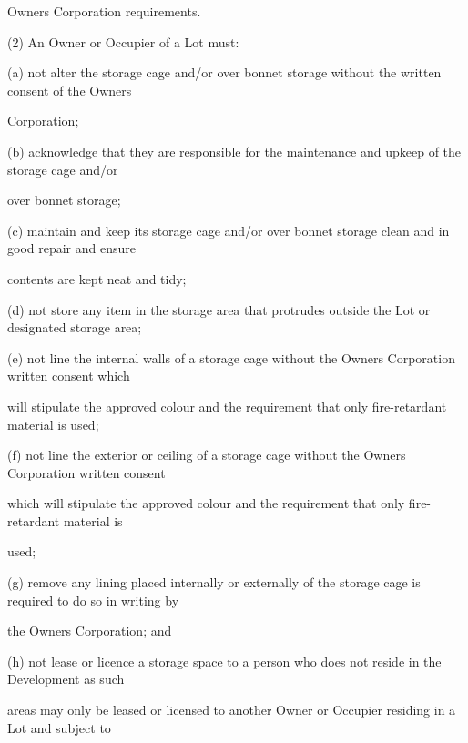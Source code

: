 \documentclass{article}
\begin{document}
{\fontsize{10.02}{1}Owners Corporation requirements. }

{\fontsize{9.962}{1}(2) An Owner or Occupier of a Lot must: }

{\fontsize{9.962}{1}(a) not alter the storage cage and/or over bonnet storage without the written consent of the Owners }

{\fontsize{10.02}{1}Corporation; }

{\fontsize{9.962}{1}(b) acknowledge that they are responsible for the maintenance and upkeep of the storage cage and/or }

{\fontsize{10.02}{1}over bonnet storage; }

{\fontsize{9.962}{1}(c) maintain and keep its storage cage and/or over bonnet storage clean and in good repair and ensure }

{\fontsize{10.02}{1}contents are kept neat and tidy; }

{\fontsize{9.962}{1}(d) not store any item in the storage area that protrudes outside the Lot or designated storage area; }

{\fontsize{9.962}{1}(e) not line the internal walls of a storage cage without the Owners Corporation written consent which }

{\fontsize{10.02}{1}will stipulate the approved colour and the requirement that only fire-retardant material is used; }

{\fontsize{9.962}{1}(f) not line the exterior or ceiling of a storage cage without the Owners Corporation written consent }

{\fontsize{10.02}{1}which will stipulate the approved colour and the requirement that only fire-retardant material is }

{\fontsize{10.02}{1}used; }

{\fontsize{9.962}{1}(g) remove any lining placed internally or externally of the storage cage is required to do so in writing by }

{\fontsize{10.02}{1}the Owners Corporation; and }

{\fontsize{9.962}{1}(h) not lease or licence a storage space to a person who does not reside in the Development as such }

{\fontsize{10.02}{1}areas may only be leased or licensed to another Owner or Occupier residing in a Lot and subject to }

\newpage
\end{document}
